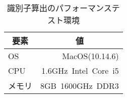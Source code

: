 \begin{table}[h]
 \caption{識別子算出のパフォーマンステスト環境}
 \centering
  \begin{tabular}{lr}
    \toprule
		\multicolumn{1}{c}{\textbf{要素}} & \multicolumn{1}{c}{\textbf{値}} \\
    \midrule
		OS & MacOS(10.14.6) \\
		CPU & 1.6GHz\ Intel\ Core\ i5 \\
		メモリ & 8GB\ 1600GHz\ DDR3 \\
    \bottomrule
  \end{tabular}
 \label{tab:overhead-test}
\end{table}
